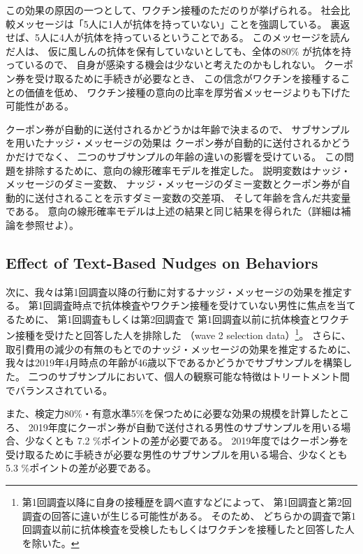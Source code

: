 \documentclass[
  11pt,
  a4paper,
]{article}
\begin{document}
この効果の原因の一つとして、ワクチン接種のただのりが挙げられる。
社会比較メッセージは「5人に1人が抗体を持っていない」ことを強調している。
裏返せば、5人に4人が抗体を持っているということである。
このメッセージを読んだ人は、
仮に風しんの抗体を保有していないとしても、全体の80\% が抗体を持っているので、
自身が感染する機会は少ないと考えたのかもしれない。
クーポン券を受け取るために手続きが必要なとき、
この信念がワクチンを接種することの価値を低め、
ワクチン接種の意向の比率を厚労省メッセージよりも下げた可能性がある。

クーポン券が自動的に送付されるかどうかは年齢で決まるので、
サブサンプルを用いたナッジ・メッセージの効果は
クーポン券が自動的に送付されるかどうかだけでなく、
二つのサブサンプルの年齢の違いの影響を受けている。
この問題を排除するために、意向の線形確率モデルを推定した。
説明変数はナッジ・メッセージのダミー変数、
ナッジ・メッセージのダミー変数とクーポン券が自動的に送付されることを示すダミー変数の交差項、
そして年齢を含んだ共変量である。
意向の線形確率モデルは上述の結果と同じ結果を得られた（詳細は補論を参照せよ）。

\hypertarget{effect-of-text-based-nudges-on-behaviors}{%
\subsection{Effect of Text-Based Nudges on Behaviors}\label{effect-of-text-based-nudges-on-behaviors}}

次に、我々は第1回調査以降の行動に対するナッジ・メッセージの効果を推定する。
第1回調査時点で抗体検査やワクチン接種を受けていない男性に焦点を当てるために、
第1回調査もしくは第2回調査で
第1回調査以前に抗体検査とワクチン接種を受けたと回答した人を排除した
（wave 2 selection data）\footnote{第1回調査以降に自身の接種歴を調べ直すなどによって、
  第1回調査と第2回調査の回答に違いが生じる可能性がある。
  そのため、
  どちらかの調査で第1回調査以前に抗体検査を受検したもしくはワクチンを接種したと回答した人を除いた。}。
さらに、
取引費用の減少の有無のもとでのナッジ・メッセージの効果を推定するために、
我々は2019年4月時点の年齢が46歳以下であるかどうかでサブサンプルを構築した。
二つのサブサンプルにおいて、個人の観察可能な特徴はトリートメント間でバランスされている。

また、検定力80\%・有意水準5\%を保つために必要な効果の規模を計算したところ、
2019年度にクーポン券が自動で送付される男性のサブサンプルを用いる場合、少なくとも
7.2
\%ポイントの差が必要である。
2019年度ではクーポン券を受け取るために手続きが必要な男性のサブサンプルを用いる場合、少なくとも
5.3
\%ポイントの差が必要である。
\end{document}
